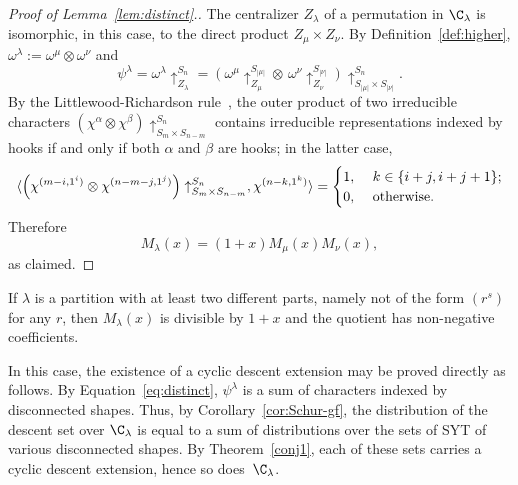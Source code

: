 \begin{proof}[Proof of Lemma~\ref{lem:distinct}.]
    The centralizer $Z_\lambda$ of a permutation in $\C_\lambda$ is isomorphic, in this case, to the direct product $Z_\mu \times Z_\nu$. 
    By Definition~\ref{def:higher}, 
    $\omega^\lambda := \omega^{\mu} \otimes \omega^\nu$ and  
    \begin{equation}\label{eq:distinct}
        \psi^\lambda 
        = \omega^\lambda\uparrow_{Z_\lambda}^{S_n}
        = \left(\omega^{\mu}\uparrow_{Z_{\mu}}^{S_{|\mu|}} \otimes \, 
		\omega^{\nu}\uparrow_{Z_{\nu}}^{S_{|\nu|}}\right)
		\uparrow_{S_{|\mu|}\times S_{|\nu|}}^{S_n}.		    
    \end{equation}
    By the Littlewood-Richardson rule~\cite[Theorem A1.3.3]{EC2}, the outer product  of two irreducible characters 
    $\left( \chi^\alpha\otimes\chi^\beta\right)\uparrow_{S_m\times S_{n-m}}^{S_n}$ 
    contains irreducible representations indexed by hooks if and only if both $\alpha$ and $\beta$ are hooks; in the latter case,
    \[
        \langle \left( \chi^{(m-i,1^i)} \otimes \chi^{(n-m-j,1^j)}\right)\uparrow_{S_m \times S_{n-m}}^{S_n}, \chi^{(n-k,1^k)}\rangle = 
        \begin{cases}
            1, & \ k\in \{i+j, i+j+1\};\\
            0, & \ \rm{otherwise.}
        \end{cases}
    \]
    Therefore
    \[
        M_\lambda(x) = (1+x) M_\mu(x) M_\nu(x),
    \]
    as claimed.
\end{proof}	

\begin{corollary}
    If $\lambda$ is a partition with at least two different parts, namely not of the form $(r^s)$ for any $r$, 
    then $M_\lambda(x)$ is divisible by $1+x$ and the quotient has non-negative coefficients.
\end{corollary}

\begin{remark}\label{rem:distinct} 
    In this case, the existence of a cyclic descent extension
    may be proved directly as follows.
    By Equation~\eqref{eq:distinct}, $\psi^\lambda$ is a sum of characters indexed by disconnected shapes. 
    Thus, by 
    Corollary~\ref{cor:Schur-gf}, the distribution of the descent set over $\C_\lambda$ is equal to a sum of distributions over the sets of SYT of various disconnected shapes.
    By Theorem~\ref{conj1}, each of these sets carries a cyclic descent extension, hence so does~$\C_\lambda$.
\end{remark}



